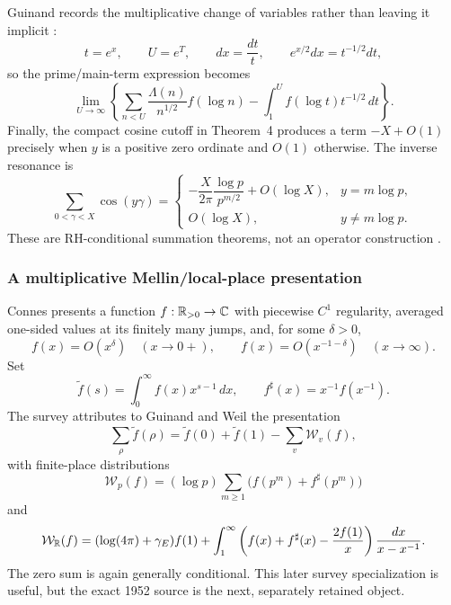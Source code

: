 Guinand records the multiplicative change of variables rather than leaving it implicit
\cite[p.~115, immediately after Thm.~3$'$]{guinand1948}:
\begin{equation}
 t=e^x,\qquad U=e^T,\qquad dx=\frac{dt}{t},\qquad
 e^{x/2}dx=t^{-1/2}dt,
 \label{eq:guinand-log-change}
\end{equation}
so the prime/main-term expression becomes
\begin{equation}
 \lim_{U\to\infty}\left\{
 \sum_{n<U}\frac{\Lambda(n)}{n^{1/2}}f(\log n)
 -\int_1^U f(\log t)t^{-1/2}\,dt\right\}.
 \label{eq:guinand-multiplicative}
\end{equation}
Finally, the compact cosine cutoff in Theorem~4 produces a term $-X+O(1)$ precisely when
$y$ is a positive zero ordinate and $O(1)$ otherwise.  The inverse resonance is
\[
 \sum_{0<\gamma<X}\cos(y\gamma)=
 \begin{cases}
 -\dfrac{X}{2\pi}\dfrac{\log p}{p^{m/2}}+O(\log X),&y=m\log p,\\[4pt]
 O(\log X),&y\neq m\log p.
 \end{cases}
\]
These are RH-conditional summation theorems, not an operator construction
\cite[pp.~115--119, Thms.~4--5]{guinand1948}.

\subsubsection{A multiplicative Mellin/local-place presentation}

Connes presents a function $f:\mathbb R_{>0}\to\mathbb C$ with piecewise $C^1$ regularity, averaged
one-sided values at its finitely many jumps, and, for some $\delta>0$,
\cite[explicit-formula presentation]{connes2026}
\[
 f(x)=O(x^\delta)\quad(x\to0+),
 \qquad
 f(x)=O(x^{-1-\delta})\quad(x\to\infty).
\]
Set
\begin{equation}
 \widetilde f(s)=\int_0^\infty f(x)x^{s-1}\,dx,
 \qquad
 f^\sharp(x)=x^{-1}f(x^{-1}).
 \label{eq:mellin-sharp}
\end{equation}
The survey attributes to Guinand and Weil the presentation
\begin{equation}
 \sum_\rho \widetilde f(\rho)
 =\widetilde f(0)+\widetilde f(1)-\sum_v\mathcal W_v(f),
 \label{eq:local-explicit}
\end{equation}
with finite-place distributions
\begin{equation}
 \mathcal W_p(f)=(\log p)\sum_{m\geq1}
 \bigl(f(p^m)+f^\sharp(p^m)\bigr)
 \label{eq:finite-place}
\end{equation}
and
\begin{equation}
 \mathcal W_\mathbb R(f)=(\log(4\pi)+\gamma_E)f(1)
 +\int_1^\infty
 \left(f(x)+f^\sharp(x)-\frac{2f(1)}x\right)\frac{dx}{x-x^{-1}}.
 \label{eq:arch-place}
\end{equation}
The zero sum is again generally conditional.  This later survey specialization is useful, but
the exact 1952 source is the next, separately retained object.

